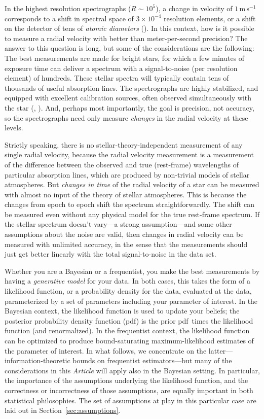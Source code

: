 \documentclass[modern]{aastex631}
\newcommand{\unit}[1]{\mathrm{#1}}
\newcommand{\m}{\unit{m}}
\newcommand{\s}{\unit{s}}
\newcommand{\mps}{\m\,\s^{-1}}
\newcommand{\documentname}{\textsl{Article}}
\newcommand{\sectionname}{Section}
\newcommand{\secref}[1]{\sectionname~\ref{#1}}
\newcommand{\pdf}{pdf} %
\begin{document}
In the highest resolution spectrographs ($R\sim 10^5$), a change in velocity of $1\,\mps$ corresponds to a shift in spectral space of $3\times 10^{-4}$ resolution elements, or a shift on the detector of tens of \emph{atomic diameters} (\citealt{zhaophd}).
In this context, how is it possible to measure a radial velocity with better than meter-per-second precision?
The answer to this question is long, but some of the considerations are the following:
The best measurements are made for bright stars, for which a few minutes of exposure time can deliver a spectrum with a signal-to-noise (per resolution element) of hundreds.
These stellar spectra will typically contain tens of thousands of useful absorption lines.
The spectrographs are highly stabilized, and equipped with excellent calibration sources, often observed simultaneously with the star (\citealt{simultaneousreference}, \citealt{gascell}).
And, perhaps most importantly, the goal is precision, not accuracy, so the spectrographs need only measure \emph{changes} in the radial velocity at these levels.

Strictly speaking, there is no stellar-theory-independent measurement of any single radial velocity, because the radial velocity measurement is a measurement of the difference between the observed and true (rest-frame) wavelengths of particular absorption lines, which are produced by non-trivial models of stellar atmospheres.
But \emph{changes in time} of the radial velocity of a star can be measured with almost no input of the theory of stellar atmospheres.
This is because the changes from epoch to epoch shift the spectrum straightforwardly.
The shift can be measured even without any physical model for the true rest-frame spectrum.
If the stellar spectrum doesn't vary---a strong assumption---and some other assumptions about the noise are valid, then changes in radial velocity can be measured with unlimited accuracy, in the sense that the measurements should just get better linearly with the total signal-to-noise in the data set.

Whether you are a Bayesian or a frequentist, you make the best measurements by having a \emph{generative model} for your data.
In both cases, this takes the form of a likelihood function, or a probability density for the data, evaluated at the data, parameterized by a set of parameters including your parameter of interest.
In the Bayesian context, the likelihood function is used to update your beliefs; the posterior probability density function (\pdf) is the prior \pdf\ times the likelihood function (and renormalized).
In the frequentist context, the likelihood function can be optimized to produce bound-saturating maximum-likelihood estimates of the parameter of interest.
In what follows, we concentrate on the latter---information-theoretic bounds on frequentist estimators---but many of the considerations in this \documentname{} will apply also in the Bayesian setting.
In particular, the importance of the assumptions underlying the likelihood function, and the correctness or incorrectness of those assumptions, are equally important in both statistical philosophies.
The set of assumptions at play in this particular case are laid out in \secref{sec:assumptions}.
\end{document}
